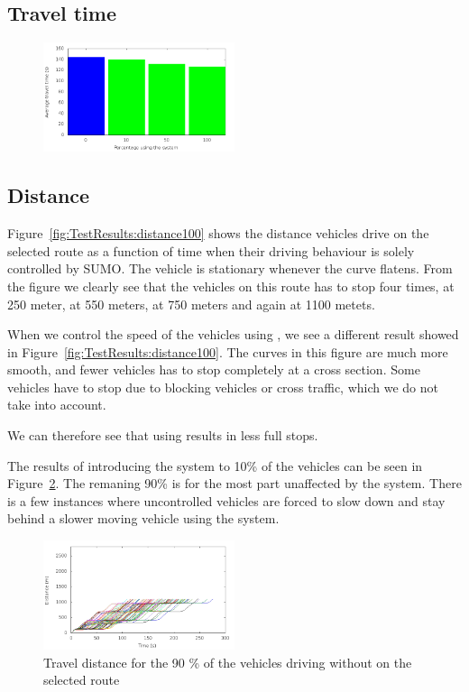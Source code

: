 \subsection{Travel time}
\begin{figure}[h]
\includegraphics[width=0.5\textwidth]{../images/tp0/combinedTime.png}
\caption{}
\label{fig:TestResults:combinedTime}
\end{figure}

\subsection{Distance}
Figure~\ref{fig:TestResults:distance100} shows the distance vehicles drive on the selected route as a function of time when their driving behaviour is solely controlled by SUMO. 
The vehicle is stationary whenever the curve flatens.
From the figure we clearly see that the vehicles on this route has to stop four times, at 250 meter, at 550 meters, at 750 meters and again at 1100 metets.

When we control the speed of the vehicles using \tech, we see a different result showed in Figure~\ref{fig:TestResults:distance100}.
The curves in this figure are much more smooth, and fewer vehicles has to stop completely at a cross section.
Some vehicles have to stop due to blocking vehicles or cross traffic, which we do not take into account.

We can therefore see that using \tech results in less full stops.

The results of introducing the system to 10\% of the vehicles can be seen in Figure~\ref{fig:TestResults:distanceUnC10}. 
The remaning 90\% is for the most part unaffected by the system. 
There is a few instances where uncontrolled vehicles are forced to slow down and stay behind a slower moving vehicle using the system.

\begin{figure}[H]
\includegraphics[width=0.5\textwidth]{../images/tp0/distanceUncontrolled10.png}
\caption{Travel distance for the 90 \% of the vehicles driving without \tech on the selected route}
\label{fig:TestResults:distanceUnC10}
\end{figure}

